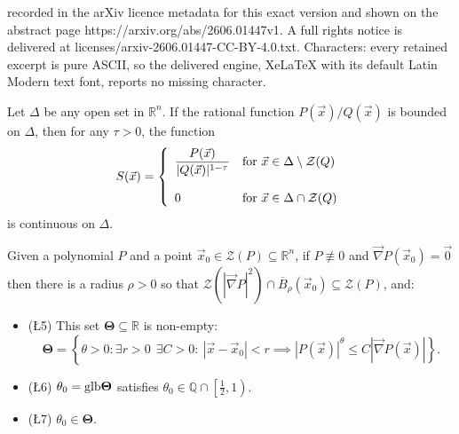 \documentclass[10pt,a4paper]{amsart}
\newcommand{\glb}{\mbox{\rm glb}}
\newcommand{\qu}{\mathbb{Q}}
\newcommand{\re}{\mathbb{R}}
\newcommand{\vv}{\mathcal{Z}}
\begin{document}
recorded in the arXiv licence metadata for this exact version and shown on the abstract page https://arxiv.org/abs/2606.01447v1. A full rights notice is delivered at licenses/arxiv-2606.01447-CC-BY-4.0.txt. Characters: every retained excerpt is pure ASCII, so the delivered engine, XeLaTeX with its default Latin Modern text font, reports no missing character.
\begin{lem}\label{lem3.4}
  Let $\Delta$ be any open set in $\re^n$.  If the rational function $P(\vec x)/Q(\vec x)$ is bounded on $\Delta$, then for any $\tau>0$, the function   $$S(\vec x)=\left\{\begin{array}{ll}{\displaystyle{\frac{P(\vec x)}{|Q(\vec x)|^{1-\tau}}}} & \mbox{\rm{for} $\vec x\in\Delta\setminus\vv(Q)$}\\ & \\0& \mbox{\rm{for} $\vec x\in\Delta\cap\vv(Q)$}\end{array}\right.$$
 is continuous on $\Delta$.
\end{lem}

\begin{prop}\label{prop6.2}
  Given a polynomial $P$ and a point $\vec x_0\in\vv(P)\subseteq\re^n$, if $P\not\equiv0$ and $\vec\nabla P(\vec x_0)=\vec0$ then there is a radius $\rho>0$ so that $\vv(|\vec\nabla P|^2)\cap\overline B_\rho(\vec x_0)\subseteq\vv(P)$, and:
  \begin{itemize}
    \item {\rm{(\L5)}} This set ${\mathbf\Theta}\subseteq\re$ is non-empty:
    \begin{equation}\label{eq6.4}
  {\mathbf\Theta}=\left\{\theta>0:\exists r>0\ \ \exists C>0 : \  |\vec x-\vec x_0|<r\implies|P(\vec x)|^\theta\le C\left|\vec\nabla P(\vec x)\right|\right\}.\nonumber
 \end{equation}
   \item {\rm{(\L6)}} $\theta_0=\glb{\mathbf\Theta}$ satisfies $\theta_0\in\qu\cap\left[\frac12,1\right)$. %
    \item {\rm{(\L7)}} $\theta_0\in{\mathbf\Theta}$.
  \end{itemize}
\end{prop}
\end{document}
